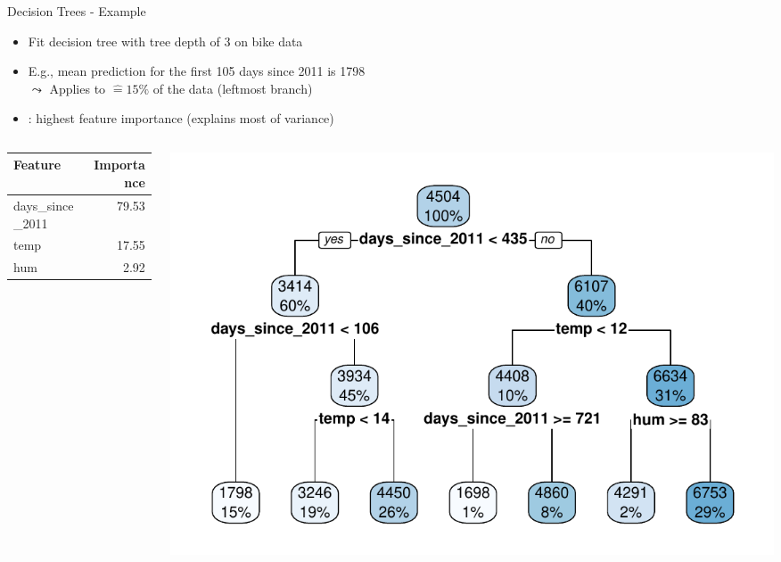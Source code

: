 \documentclass[11pt,compress,t,notes=noshow, aspectratio=169, xcolor=table]{beamer}
\begin{document}
\begin{frame}{Decision Trees - Example}
\begin{itemize}
    \item Fit decision tree with tree depth of 3 on bike data
    \item E.g., mean prediction for the first 105 days since 2011 is 1798\\
    $\leadsto$ Applies to $\hat = 15\%$ of the data (leftmost branch)
    \item {}: highest feature importance (explains most of variance)
\end{itemize}
\begin{columns}[T, totalwidth=\textwidth]
\begin{column}{0.37\textwidth}
\vspace{1.5cm}
\begin{table}[ht]
\centering
\scriptsize
\begin{tabular}{lr}
  \hline
 Feature & Importance \\
  \hline
days\_since\_2011 & 79.53 \\ 
  temp & 17.55 \\ 
  hum & 2.92 \\ 
   \hline
\end{tabular}
\end{table}
\end{column}
\begin{column}{0.63\textwidth}
  \includegraphics[width = \textwidth]{figure/tree.pdf} 
\end{column}
\end{columns}
 
\end{frame}
\end{document}
